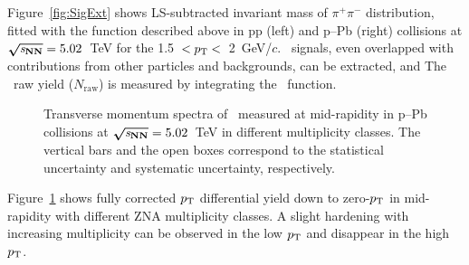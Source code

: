 \documentclass[ALICE,manyauthors]{cernphprep}
\begin{document}
Figure~\ref{fig:SigExt} shows LS-subtracted invariant mass of $\pi^{+}\pi^{-}$ distribution, fitted with the function described above in pp (left) and p--Pb (right) collisions at $\boldsymbol{\sqrt{{\textit s_\mathrm{NN}}}}=5.02$~TeV for the 1.5~$<p_{\rm{T}}<$~2~GeV/$c$. \fzero~signals, even overlapped with contributions from other particles and backgrounds, can be extracted, and The \fzero~raw yield ($N_{\mathrm{raw}}$) is measured by integrating the \fzero~function.

\begin{figure}[!hbt]
	\centering
	\caption{ Transverse momentum spectra of \fzero~measured at mid-rapidity in p--Pb collisions at $\boldsymbol{\sqrt{{\textit s_\mathrm{NN}}}}=5.02$~TeV in different multiplicity classes. The vertical bars and the open boxes correspond to the statistical uncertainty and systematic uncertainty, respectively. }
	\label{fig:pt}
\end{figure}

Figure~\ref{fig:pt} shows fully corrected $p_{\rm{T}}$ differential yield down to zero-$p_{\rm{T}}$ in mid-rapidity with different ZNA multiplicity classes. A slight hardening with increasing multiplicity can be observed in the low $p_{\rm{T}}$ and disappear in the high $p_{\rm{T}}$. 
\end{document}
